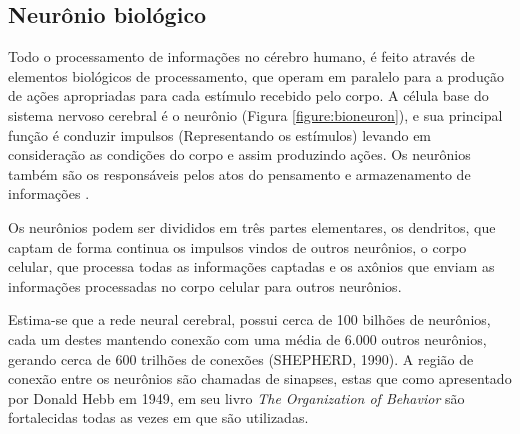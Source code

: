 \subsection{Neurônio biológico}


Todo o processamento de informações no cérebro humano, é feito através de elementos biológicos de processamento, que operam em paralelo para a produção de ações apropriadas para cada estímulo recebido pelo corpo. A célula base do sistema nervoso cerebral é o neurônio (Figura \ref{figure:bioneuron}), e sua principal função é conduzir impulsos (Representando os estímulos) levando em consideração as condições do corpo e assim produzindo ações. Os neurônios também são os responsáveis pelos atos do pensamento e armazenamento de informações \cite{livroNunes2016}.

Os neurônios podem ser divididos em três partes elementares, os dendritos, que captam de forma continua os impulsos vindos de outros neurônios, o corpo celular, que processa todas as informações captadas e os axônios que enviam as informações processadas no corpo celular para outros neurônios.


Estima-se que a rede neural cerebral, possui cerca de 100 bilhões de neurônios, cada um destes mantendo conexão com uma média de 6.000 outros neurônios, gerando cerca de 600 trilhões de conexões (SHEPHERD, 1990). A região de conexão entre os neurônios são chamadas de sinapses, estas que como apresentado por Donald Hebb em 1949, em seu livro \textit{The Organization of Behavior} são fortalecidas todas as vezes em que são utilizadas.



